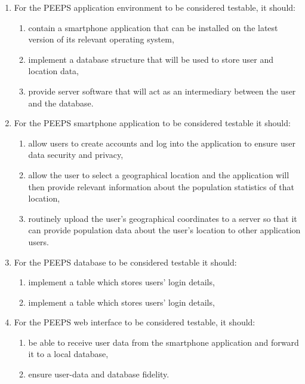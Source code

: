 \begin{enumerate}
    \item For the PEEPS application environment to be considered testable, it should:
    \begin{enumerate}
        \item contain a smartphone application that can be installed on the latest version of its relevant operating system,
        \item implement a database structure that will be used to store user and location data,
        \item provide server software that will act as an intermediary between the user and the database.
    \end{enumerate}
    \item For the PEEPS smartphone application to be considered testable it should:
    \begin{enumerate}
        \item allow users to create accounts and log into the application to ensure user data security and privacy,
        \item allow the user to select a geographical location and the application will then provide relevant information about the population statistics of that location,
        \item routinely upload the user’s geographical coordinates to a server so that it can provide population data about the user’s location to other application users.
    \end{enumerate}
    \item For the PEEPS database to be considered testable it should:
    \begin{enumerate}
        \item implement a table which stores users’ login details,
        \item implement a table which stores users’ login details,
    \end{enumerate}
    \item For the PEEPS web interface to be considered testable, it should:
    \begin{enumerate}
        \item be able to receive user data from the smartphone application and forward it to a local database,
        \item ensure user-data and database fidelity.
    \end{enumerate}
\end{enumerate}

